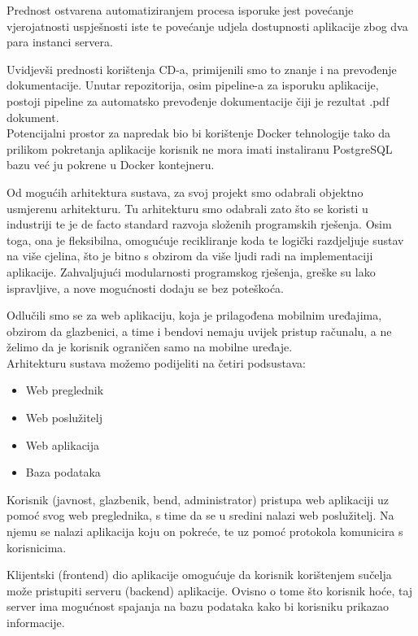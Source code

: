 	Prednost ostvarena automatiziranjem procesa isporuke jest povećanje vjerojatnosti uspješnosti iste te povećanje udjela dostupnosti aplikacije zbog dva para instanci servera.
	
	Uvidjevši prednosti korištenja CD-a, primijenili smo to znanje i na prevođenje dokumentacije. 
	Unutar repozitorija, osim pipeline-a za isporuku aplikacije, postoji pipeline za automatsko prevođenje dokumentacije čiji je rezultat .pdf dokument.\\
	Potencijalni prostor za napredak bio bi korištenje Docker tehnologije tako da prilikom pokretanja aplikacije korisnik ne mora imati instaliranu PostgreSQL bazu već ju pokrene u Docker kontejneru.
	
	Od mogućih arhitektura sustava, za svoj projekt smo odabrali objektno usmjerenu arhitekturu. Tu arhitekturu smo odabrali zato što se koristi u industriji te je de facto standard razvoja složenih programskih rješenja. Osim toga, ona je fleksibilna, omogućuje recikliranje koda te logički razdjeljuje sustav na više cjelina, što je bitno s obzirom da više ljudi radi na implementaciji aplikacije. Zahvaljujući modularnosti programskog rješenja, greške su lako ispravljive, a nove mogućnosti dodaju se bez poteškoća.

	Odlučili smo se za web aplikaciju, koja je prilagođena mobilnim uređajima, obzirom da glazbenici, a time i bendovi nemaju uvijek pristup računalu, a ne želimo da je korisnik ograničen samo na mobilne uređaje.\\

	Arhitekturu sustava možemo podijeliti na četiri podsustava:
		\begin{itemize}
			\item Web preglednik
			\item Web poslužitelj
    			\item Web aplikacija
			\item Baza podataka
		\end{itemize}

	
	
	Korisnik (javnost, glazbenik, bend, administrator) pristupa web aplikaciji uz pomoć svog web preglednika, s time da se u sredini nalazi web poslužitelj. Na njemu se nalazi aplikacija koju on pokreće, te uz pomoć protokola komunicira s korisnicima.

	Klijentski (frontend) dio aplikacije omogućuje da korisnik korištenjem sučelja može pristupiti serveru (backend) aplikacije. Ovisno o tome što korisnik hoće, taj server ima mogućnost spajanja na bazu podataka kako bi korisniku prikazao informacije.

